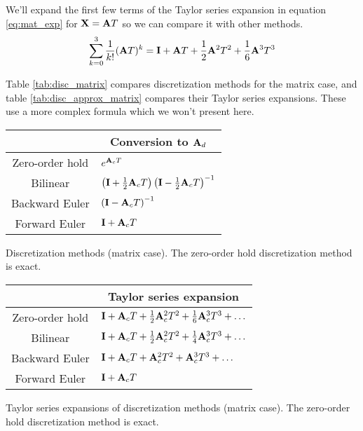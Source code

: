 We'll expand the first few terms of the Taylor series expansion in equation
\eqref{eq:mat_exp} for $\mathbf{X} = \mathbf{A}T$ so we can compare it with other
methods.
\begin{equation*}
  \sum_{k=0}^3 \frac{1}{k!} (\mathbf{A}T)^k = \mathbf{I} + \mathbf{A}T +
    \frac{1}{2}\mathbf{A}^2T^2 + \frac{1}{6}\mathbf{A}^3T^3
\end{equation*}

Table \ref{tab:disc_matrix} compares \gls{discretization} methods for the matrix
case, and table \ref{tab:disc_approx_matrix} compares their Taylor series
expansions. These use a more complex formula which we won't present here.
\begin{booktable}
  \begin{tabular}{|cl|}
    \hline
    \rowcolor{headingbg}
    \multicolumn{1}{|c}{\textbf{Method}} &
      \multicolumn{1}{c|}{\textbf{Conversion to $\mathbf{A}_d$}} \\
    \hline
    Zero-order hold & $e^{\mathbf{A}_c T}$ \\
    Bilinear &
      $\left(\mathbf{I} + \frac{1}{2}\mathbf{A}_c T\right)
        \left(\mathbf{I} - \frac{1}{2}\mathbf{A}_c T\right)^{-1}$ \\
    Backward Euler & $\left(\mathbf{I} - \mathbf{A}_c T\right)^{-1}$ \\
    Forward Euler & $\mathbf{I} + \mathbf{A}_c T$ \\
    \hline
  \end{tabular}
  \caption{Discretization methods (matrix case). The zero-order hold
    discretization method is exact.}
  \label{tab:disc_matrix}
\end{booktable}
\begin{booktable}
  \begin{tabular}{|cl|}
    \hline
    \rowcolor{headingbg}
    \multicolumn{1}{|c}{\textbf{Method}} &
      \multicolumn{1}{c|}{\textbf{Taylor series expansion}} \\
    \hline
    Zero-order hold &
      $\mathbf{I} + \mathbf{A}_c T + \frac{1}{2}\mathbf{A}_c^2T^2 +
        \frac{1}{6}\mathbf{A}_c^3T^3 + \ldots$ \\
    Bilinear &
      $\mathbf{I} + \mathbf{A}_c T + \frac{1}{2}\mathbf{A}_c^2T^2 +
        \frac{1}{4}\mathbf{A}_c^3T^3 + \ldots$ \\
    Backward Euler &
      $\mathbf{I} + \mathbf{A}_c T + \mathbf{A}_c^2T^2 + \mathbf{A}_c^3T^3 + \ldots$ \\
    Forward Euler & $\mathbf{I} + \mathbf{A}_c T$ \\
    \hline
  \end{tabular}
  \caption{Taylor series expansions of discretization methods (matrix case).
    The zero-order hold discretization method is exact.}
  \label{tab:disc_approx_matrix}
\end{booktable}

